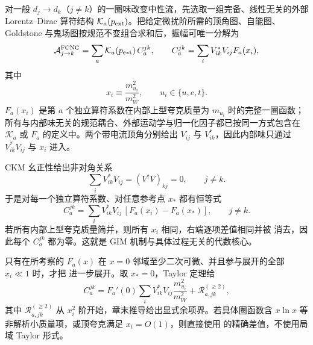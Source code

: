 \begin{proposition}
对一般 $d_j\to d_k$（$j\ne k$）的一圈味改变中性流，先选取一组完备、线性无关的外部 Lorentz--Dirac 算符结构 $\mathcal K_a(p_{\rm ext})$。把给定微扰阶所需的顶角图、自能图、Goldstone 与鬼场图按规范不变组合求和后，振幅可唯一分解为
\begin{equation}
 {
 \mathcal A_{j\to k}^{\rm FCNC}
 =\sum_a \mathcal K_a(p_{\rm ext})\,C_a^{jk},
 \qquad
 C_a^{jk}
 =\sum_iV_{ik}^*V_{ij}F_a(x_i),}
 \label{eq:sm-gim-loop-sum-dp83}
\end{equation}
其中
\begin{equation*}
 x_i\equiv\frac{m_{u_i}^2}{m_W^2},
 \qquad u_i\in\{u,c,t\}.
\end{equation*}
$F_a(x_i)$ 是第 $a$ 个独立算符系数在内部上型夸克质量为 $m_{u_i}$ 时的完整一圈函数；所有与内部味无关的规范耦合、外部运动学与归一化因子都已按同一方式包含在 $\mathcal K_a$ 或 $F_a$ 的定义中。两个带电流顶角分别给出 $V_{ij}$ 与 $V_{ik}^*$，因此内部味只通过 $V_{ik}^*V_{ij}$ 与 $x_i$ 进入。

CKM 幺正性给出非对角关系
\begin{equation}
 {
 \sum_iV_{ik}^*V_{ij}=(V^\dagger V)_{kj}=0,
 \qquad j\ne k.}
 \label{eq:sm-gim-unitarity-dp83}
\end{equation}
于是对每一个独立算符系数、对任意参考点 $x_*$ 都有恒等式
\begin{equation}
 {
 C_a^{jk}
 =\sum_iV_{ik}^*V_{ij}\,[F_a(x_i)-F_a(x_*)],
 \qquad j\ne k.}
 \label{eq:sm-gim-subtracted-exact-dp85}
\end{equation}
若所有内部上型夸克质量简并，则所有 $x_i$ 相同，右端逐项差值相同并被 消去，因此每个 $C_a^{jk}$ 都为零。这就是 GIM 机制与具体过程无关的代数核心。

只有在所考察的 $F_a(x)$ 在 $x=0$ 邻域至少二次可微、并且参与展开的全部 $x_i\ll1$ 时，才把 进一步展开。取 $x_*=0$，Taylor 定理给
\begin{equation}
 {
 C_a^{jk}
 =F_a'(0)
 \sum_iV_{ik}^*V_{ij}\frac{m_{u_i}^2}{m_W^2}
 +\mathcal R_{a,jk}^{(\ge2)},}
 \label{eq:sm-gim-mass-suppression-dp83}
\end{equation}
其中 $\mathcal R_{a,jk}^{(\ge2)}$ 从 $x_i^2$ 阶开始，章末推导给出显式余项界。若具体圈函数含 $x\ln x$ 等非解析小质量项，或顶夸克满足 $x_t=O(1)$，则直接使用 的精确差值，不使用局域 Taylor 形式。
\end{proposition}



